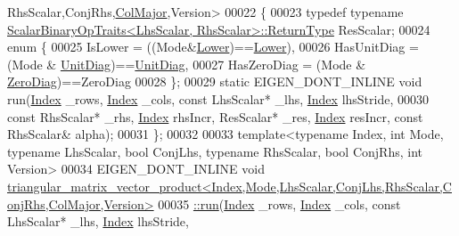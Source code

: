 \begin{DoxyCode}
      RhsScalar,ConjRhs,\hyperlink{group__enums_ggaacded1a18ae58b0f554751f6cdf9eb13a0cbd4bdd0abcfc0224c5fcb5e4f6669a}{ColMajor},Version>
00022 \{
00023   \textcolor{keyword}{typedef} \textcolor{keyword}{typename} \hyperlink{group___core___module_struct_eigen_1_1_scalar_binary_op_traits}{ScalarBinaryOpTraits<LhsScalar, RhsScalar>::ReturnType}
       ResScalar;
00024   \textcolor{keyword}{enum} \{
00025     IsLower = ((Mode&\hyperlink{group__enums_gga39e3366ff5554d731e7dc8bb642f83cda891792b8ed394f7607ab16dd716f60e6}{Lower})==\hyperlink{group__enums_gga39e3366ff5554d731e7dc8bb642f83cda891792b8ed394f7607ab16dd716f60e6}{Lower}),
00026     HasUnitDiag = (Mode & \hyperlink{group__enums_gga39e3366ff5554d731e7dc8bb642f83cdaddb72f888ac85d5a1c52333e54f9374b}{UnitDiag})==\hyperlink{group__enums_gga39e3366ff5554d731e7dc8bb642f83cdaddb72f888ac85d5a1c52333e54f9374b}{UnitDiag},
00027     HasZeroDiag = (Mode & \hyperlink{group__enums_gga39e3366ff5554d731e7dc8bb642f83cda884ff7240392e85aa6e4b3c957e36483}{ZeroDiag})==ZeroDiag
00028   \};
00029   \textcolor{keyword}{static} EIGEN\_DONT\_INLINE  \textcolor{keywordtype}{void} run(\hyperlink{namespace_eigen_a62e77e0933482dafde8fe197d9a2cfde}{Index} \_rows, \hyperlink{namespace_eigen_a62e77e0933482dafde8fe197d9a2cfde}{Index} \_cols, \textcolor{keyword}{const} LhsScalar* \_lhs, 
      \hyperlink{namespace_eigen_a62e77e0933482dafde8fe197d9a2cfde}{Index} lhsStride,
00030                                      \textcolor{keyword}{const} RhsScalar* \_rhs, \hyperlink{namespace_eigen_a62e77e0933482dafde8fe197d9a2cfde}{Index} rhsIncr, ResScalar* \_res, 
      \hyperlink{namespace_eigen_a62e77e0933482dafde8fe197d9a2cfde}{Index} resIncr, \textcolor{keyword}{const} RhsScalar& alpha);
00031 \};
00032 
00033 \textcolor{keyword}{template}<\textcolor{keyword}{typename} Index, \textcolor{keywordtype}{int} Mode, \textcolor{keyword}{typename} LhsScalar, \textcolor{keywordtype}{bool} ConjLhs, \textcolor{keyword}{typename} RhsScalar, \textcolor{keywordtype}{bool} ConjRhs, \textcolor{keywordtype}{int} 
      Version>
00034 EIGEN\_DONT\_INLINE \textcolor{keywordtype}{void} 
      \hyperlink{struct_eigen_1_1internal_1_1triangular__matrix__vector__product}{triangular\_matrix\_vector\_product<Index,Mode,LhsScalar,ConjLhs,RhsScalar,ConjRhs,ColMajor,Version>}
00035 \hyperlink{struct_eigen_1_1internal_1_1triangular__matrix__vector__product}{  ::run}(\hyperlink{namespace_eigen_a62e77e0933482dafde8fe197d9a2cfde}{Index} \_rows, \hyperlink{namespace_eigen_a62e77e0933482dafde8fe197d9a2cfde}{Index} \_cols, \textcolor{keyword}{const} LhsScalar* \_lhs, \hyperlink{namespace_eigen_a62e77e0933482dafde8fe197d9a2cfde}{Index} lhsStride,

\end{DoxyCode}
